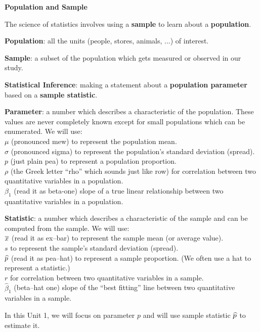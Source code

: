 \def\theTopic{Reading 2}

\begin{center}
{\bf {\large Population and Sample}}
\end{center}

The science of statistics involves using a {\bf sample} to learn about
a {\bf population}.

{\bf Population}: all the units (people, stores, animals, ...) of
interest.

{\bf Sample}:  a subset of the population which gets measured or
observed in our study.

{\bf Statistical  Inference}: making a statement about a
{\bf population parameter} based on a {\bf  sample statistic}.

{\bf Parameter}:  a number which describes a characteristic of the
population. These values are never completely known except for small
populations which can be enumerated. We will use:\\
  $\mu$ (pronounced mew) to represent the population mean.\\
  $\sigma$ (pronounced sigma) to represent the population's standard deviation
  (spread).\\
  $p$ (just plain pea) to represent a population proportion.\\
  $\rho$ (the Greek letter ``rho'' which sounds just like row) for
  correlation between two 
  quantitative variables in a population.\\
  $\beta_1$ (read it as beta-one) slope of a true
  linear relationship between  two 
  quantitative variables in a population.

{\bf Statistic}:  a number which describes a characteristic of the
sample and can be computed from the sample. We will use:\\
  $\overline{x}$ (read it as ex--bar) to represent the sample mean (or average value).\\
  $s$  to represent the sample's standard deviation
  (spread).\\
  $\widehat{p}$ (read it as pea--hat) to represent a sample proportion.  (We
  often use a hat to  represent a statistic.)\\
  $r$  for correlation between two  quantitative variables in a sample.\\
  $\widehat{\beta}_1$ (beta--hat one) slope of the ``best fitting''
  line  between  two  quantitative variables in a sample.

In this Unit 1, we will focus on parameter $p$ and will use sample
statistic $\widehat{p}$ to estimate it.

